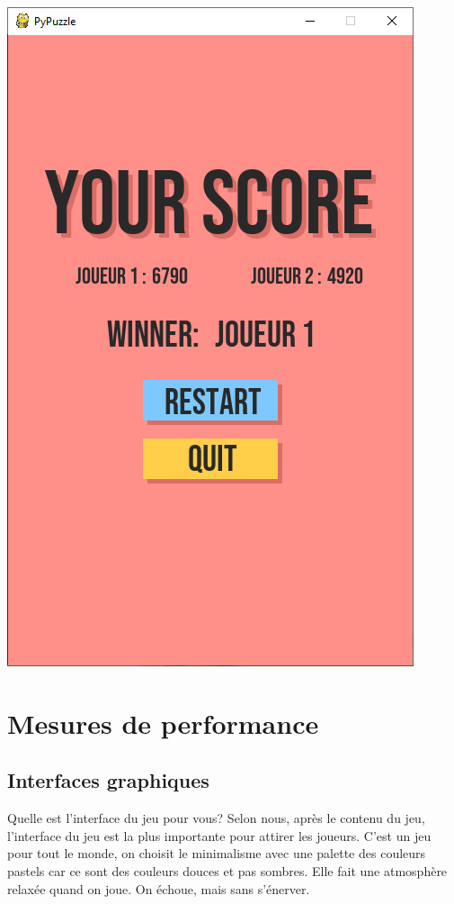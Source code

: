 \documentclass[a4paper]{report}
\begin{document}
\begin{enumerate}
        \includegraphics[scale=0.3]{images/4-endmulti.png}
\end{enumerate}


\section{Mesures de performance}

\subsection{Interfaces graphiques} 
Quelle est l'interface du jeu pour vous? Selon nous, après le contenu du jeu, l'interface du jeu est la plus importante pour attirer les joueurs.
C'est un jeu pour tout le monde, on choisit le minimalisme avec
une palette des couleurs pastels car ce sont des couleurs douces et pas sombres. 
Elle fait une atmosphère relaxée quand on joue. On échoue, mais sans s'énerver.\\
\end{document}
